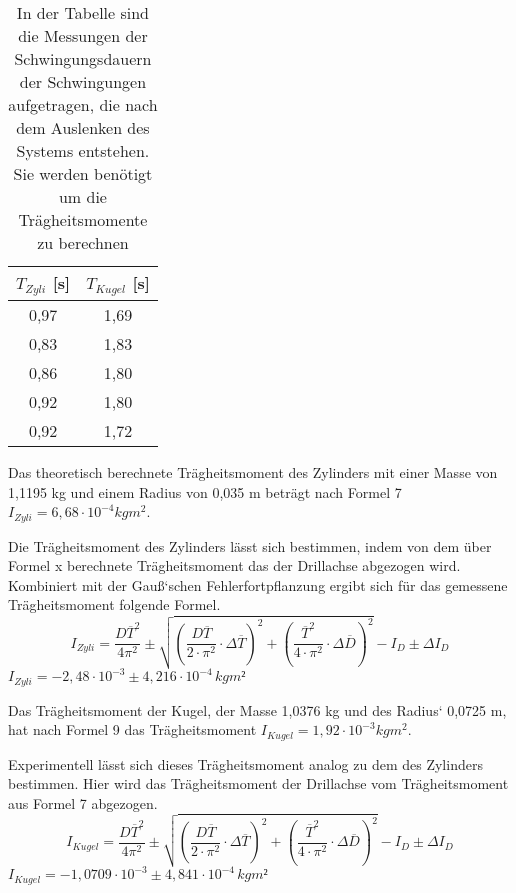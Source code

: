 \documentclass[titlepage = firstcover]{scrartcl}
\begin{document}
      \begin{table}[h]
        \centering
        \caption{In der Tabelle sind die Messungen der Schwingungsdauern der Schwingungen aufgetragen, die nach dem Auslenken des Systems entstehen. Sie werden benötigt um die Trägheitsmomente zu berechnen}
        \label{tab:Tabelle_3}

        \begin{tabular}{c c}
          \toprule
          {$T_{Zyli}$ [s]} & {$T_{Kugel}$ [s]} \\
          \midrule
          0,97 & 1,69 \\
          0,83 & 1,83 \\
          0,86 & 1,80 \\
          0,92 & 1,80 \\
          0,92 & 1,72 \\
          \bottomrule
        \end{tabular}
      \end{table}
      
      Das theoretisch berechnete Trägheitsmoment des Zylinders mit einer Masse von 1,1195 kg und einem Radius von 0,035 m beträgt nach Formel 7 
      $I_{Zyli} = 6,68 \cdot 10^{-4} kgm^2$. \newline
      
      Die Trägheitsmoment des Zylinders lässt sich bestimmen, indem von dem über Formel x berechnete Trägheitsmoment das der Drillachse abgezogen wird. Kombiniert
      mit der Gauß`schen Fehlerfortpflanzung ergibt sich für das gemessene Trägheitsmoment folgende Formel.
      \begin{equation}
        I_{Zyli} = \frac{D\overline{T}^2}{4\pi^2} \pm \sqrt{(\frac{D\overline{T}}{2\cdot \pi^2} \cdot \Delta \overline{T})^2 + (\frac{\overline{T}^2}{4 \cdot \pi^2} \cdot \Delta \overline{D})^2} - I_D \pm \Delta I_D
      \end{equation}
      $I_{Zyli} = -2,48 \cdot 10^{-3} \pm 4,216\cdot 10^{-4} \, kgm²$

      Das Trägheitsmoment der Kugel, der Masse 1,0376 kg und des Radius` 0,0725 m, hat nach Formel 9 das Trägheitsmoment $I_{Kugel} = 1,92 \cdot 10^{-3} kgm^2$. \newline

      Experimentell lässt sich dieses Trägheitsmoment analog zu dem des Zylinders bestimmen. Hier wird das Trägheitsmoment der Drillachse vom Trägheitsmoment
      aus Formel 7 abgezogen.
      \begin{equation}
        I_{Kugel} = \frac{D\overline{T}^2}{4\pi^2} \pm \sqrt{(\frac{D\overline{T}}{2\cdot \pi^2} \cdot \Delta \overline{T})^2 + (\frac{\overline{T}^2}{4 \cdot \pi^2} \cdot \Delta \overline{D})^2} - I_D \pm \Delta I_D
      \end{equation}
      $I_{Kugel} = -1,0709 \cdot 10^{-3} \pm 4,841 \cdot 10^{-4} \, kgm²$
      
\end{document}
